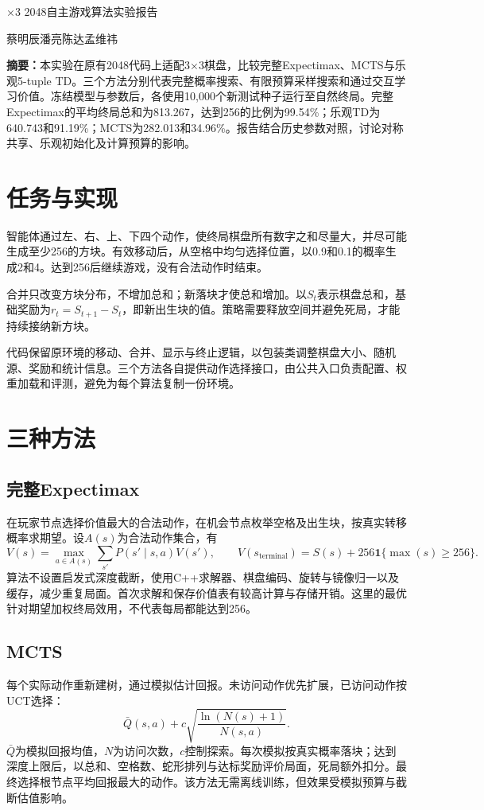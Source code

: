 \documentclass[UTF8,zihao=-4,fontset=none]{ctexart}
\providecommand{\heiti}{\CJKfamily{zhhei}}
\begin{document}
{\centering\heiti\fontsize{18bp}{24bp}×3 2048自主游戏算法实验报告\par}
{\centering 蔡明辰\quad 潘亮\quad 陈达\quad 孟维祎\par}
\noindent\textbf{摘要：}本实验在原有2048代码上适配3×3棋盘，比较完整Expectimax、MCTS与乐观5-tuple TD。三个方法分别代表完整概率搜索、有限预算采样搜索和通过交互学习价值。冻结模型与参数后，各使用10,000个新测试种子运行至自然终局。完整Expectimax的平均终局总和为813.267，达到256的比例为99.54\%；乐观TD为640.743和91.19\%；MCTS为282.013和34.96\%。报告结合历史参数对照，讨论对称共享、乐观初始化及计算预算的影响。
\section{任务与实现}
智能体通过左、右、上、下四个动作，使终局棋盘所有数字之和尽量大，并尽可能生成至少256的方块。有效移动后，从空格中均匀选择位置，以0.9和0.1的概率生成2和4。达到256后继续游戏，没有合法动作时结束。

合并只改变方块分布，不增加总和；新落块才使总和增加。以$S_t$表示棋盘总和，基础奖励为$r_t=S_{t+1}-S_t$，即新出生块的值。策略需要释放空间并避免死局，才能持续接纳新方块。

代码保留原环境的移动、合并、显示与终止逻辑，以包装类调整棋盘大小、随机源、奖励和统计信息。三个方法各自提供动作选择接口，由公共入口负责配置、权重加载和评测，避免为每个算法复制一份环境。
\section{三种方法}
\subsection{完整Expectimax}
在玩家节点选择价值最大的合法动作，在机会节点枚举空格及出生块，按真实转移概率求期望。设$A(s)$为合法动作集合，有
\begin{equation}
V(s)=\max_{a\in A(s)}\sum_{s'}P(s'\mid s,a)V(s'),\qquad
V(s_{\mathrm{terminal}})=S(s)+256\mathbf{1}\{\max(s)\ge256\}.
\end{equation}
算法不设置启发式深度截断，使用C++求解器、棋盘编码、旋转与镜像归一以及缓存，减少重复局面。首次求解和保存价值表有较高计算与存储开销。这里的最优针对期望加权终局效用，不代表每局都能达到256。
\subsection{MCTS}
每个实际动作重新建树，通过模拟估计回报。未访问动作优先扩展，已访问动作按UCT选择：
\begin{equation}
\bar Q(s,a)+c\sqrt{\frac{\ln(N(s)+1)}{N(s,a)}}.
\end{equation}
$\bar Q$为模拟回报均值，$N$为访问次数，$c$控制探索。每次模拟按真实概率落块；达到深度上限后，以总和、空格数、蛇形排列与达标奖励评价局面，死局额外扣分。最终选择根节点平均回报最大的动作。该方法无需离线训练，但效果受模拟预算与截断估值影响。
\end{document}
